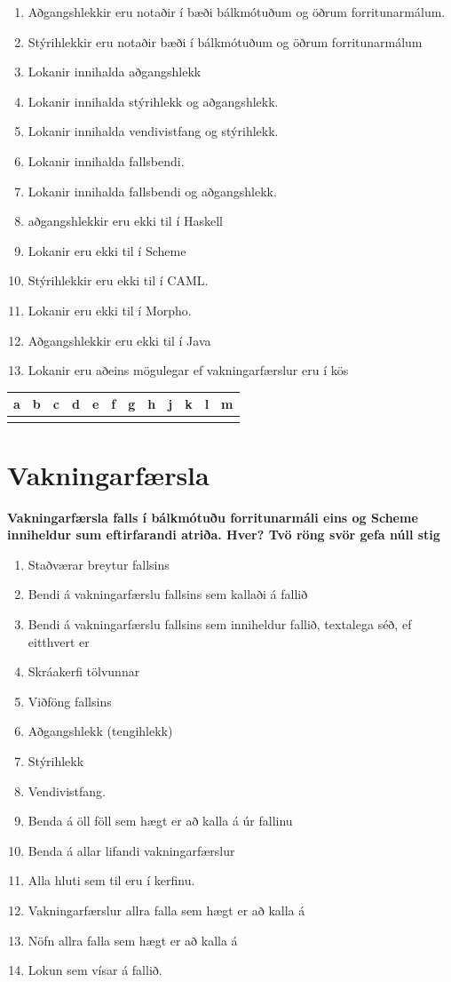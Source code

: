\documentclass{article}
\newcommand{\bo}[1]{\textbf{#1}}
\newcommand{\enum}{\begin{enumerate}[label = \alph*.]}
\begin{document}
\enum
\item Aðgangshlekkir eru notaðir í bæði bálkmótuðum og öðrum
forritunarmálum.
\item Stýrihlekkir eru notaðir bæði í bálkmótuðum og öðrum
forritunarmálum
\item Lokanir innihalda aðgangshlekk
\item Lokanir innihalda stýrihlekk og aðgangshlekk.
\item Lokanir innihalda vendivistfang og stýrihlekk.
\item Lokanir innihalda fallsbendi.
\item Lokanir innihalda fallsbendi og aðgangshlekk.
\item aðgangshlekkir eru ekki til í Haskell
\item Lokanir eru ekki til í Scheme
\item Stýrihlekkir eru ekki til í CAML.
\item Lokanir eru ekki til í Morpho.
\item Aðgangshlekkir eru ekki til í Java
\item Lokanir eru aðeins mögulegar ef vakningarfærslur eru í kös
\end{enumerate}

\begin{tabularx}{\textwidth}{|X|X|X|X|X|X|X|X|X|X|X|X|}
    \hline
    \bo{a} & \bo{b} & \bo{c} & \bo{d} & \bo{e} & \bo{f} & \bo{g} & \bo{h} & \bo{j} & \bo{k} & \bo{l} & \bo{m}  \\ \hline
     & & & & & & & & & & &  \\ \hline
\end{tabularx}


\newpage
\section{Vakningarfærsla}

\bo{Vakningarfærsla falls í bálkmótuðu forritunarmáli eins og Scheme
inniheldur sum eftirfarandi atriða. Hver? Tvö röng svör gefa núll
stig}

\enum
\item Staðværar breytur fallsins
\item Bendi á vakningarfærslu fallsins sem kallaði á fallið
\item Bendi á vakningarfærslu fallsins sem inniheldur fallið, textalega
séð, ef eitthvert er
\item Skráakerfi tölvunnar
\item Viðföng fallsins
\item Aðgangshlekk (tengihlekk)
\item Stýrihlekk
\item Vendivistfang.
\item Benda á öll föll sem hægt er að kalla á úr fallinu
\item Benda á allar lifandi vakningarfærslur
\item Alla hluti sem til eru í kerfinu.
\item Vakningarfærslur allra falla sem hægt er að kalla á
\item Nöfn allra falla sem hægt er að kalla á
\item Lokun sem vísar á fallið.
\end{enumerate}
\end{document}
